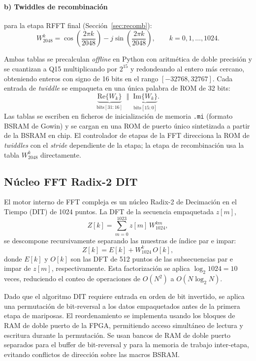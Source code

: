 \documentclass[11pt,a4paper]{article}
\begin{document}
\paragraph{b) Twiddles de recombinación} para la etapa RFFT final
(Sección~\ref{sec:recomb}):
\begin{equation}
  W_{2048}^{k} = \cos\!\left(\frac{2\pi k}{2048}\right) - j\sin\!\left(\frac{2\pi k}{2048}\right), \qquad k = 0,1,\dots,1024.
\end{equation}

Ambas tablas se precalculan \emph{offline} en Python con aritmética de doble
precisión y se cuantizan a Q15 multiplicando por $2^{15}$ y redondeando al
entero más cercano, obteniendo enteros con signo de 16 bits en el rango
$[-32768, 32767]$. Cada entrada de \emph{twiddle} se empaqueta en una única
palabra de ROM de 32 bits:
\begin{equation}
  \underbrace{\mathrm{Re}\{W_k\}}_{\text{bits}[31:16]} \;\;\Vert\;\; \underbrace{\mathrm{Im}\{W_k\}}_{\text{bits}[15:0]}.
\end{equation}
Las tablas se escriben en ficheros de inicialización de memoria \texttt{.mi}
(formato BSRAM de Gowin) y se cargan en una ROM de puerto único sintetizada a
partir de la BSRAM en chip. El controlador de etapas de la FFT direcciona la
ROM de \emph{twiddles} con el \emph{stride} dependiente de la etapa; la etapa de
recombinación usa la tabla $W_{2048}^{k}$ directamente.

\subsection{Núcleo FFT Radix-2 DIT}
\label{sec:fftcore}
El motor interno de FFT compleja es un núcleo Radix-2 de Decimación en el
Tiempo (DIT) de 1024 puntos. La DFT de la secuencia empaquetada $z[m]$,
\begin{equation}
  Z[k] = \sum_{m=0}^{1023} z[m]\,W_{1024}^{km},
\end{equation}
se descompone recursivamente separando las muestras de índice par e impar:
\begin{equation}
  Z[k] = E[k] + W_{1024}^{k}\,O[k],
\end{equation}
donde $E[k]$ y $O[k]$ son las DFT de 512 puntos de las subsecuencias par e
impar de $z[m]$, respectivamente. Esta factorización se aplica
$\log_2 1024 = 10$ veces, reduciendo el conteo de operaciones de $O(N^2)$ a
$O(N\log_2 N)$.

Dado que el algoritmo DIT requiere entrada en orden de bit invertido, se aplica
una permutación de bit-reversal a los datos empaquetados antes de la primera
etapa de mariposas. El reordenamiento se implementa usando los bloques de RAM
de doble puerto de la FPGA, permitiendo acceso simultáneo de lectura y
escritura durante la permutación. Se usan bancos de RAM de doble puerto
separados para el buffer de bit-reversal y para la memoria de trabajo
inter-etapa, evitando conflictos de dirección sobre las macros BSRAM.
\end{document}
